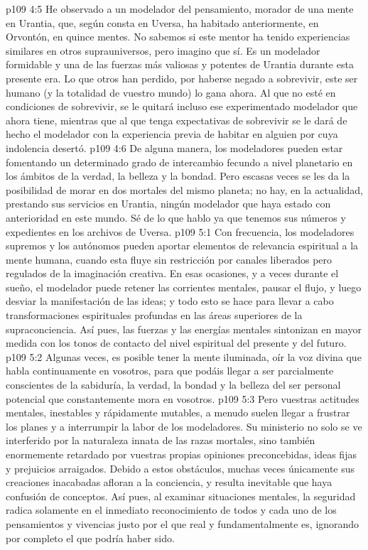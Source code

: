 \vs p109 4:5 \pc He observado a un modelador del pensamiento, morador de una mente en Urantia, que, según consta en Uversa, ha habitado anteriormente, en Orvontón, en quince mentes. No sabemos si este mentor ha tenido experiencias similares en otros suprauniversos, pero imagino que sí. Es un modelador formidable y una de las fuerzas más valiosas y potentes de Urantia durante esta presente era. Lo que otros han perdido, por haberse negado a sobrevivir, este ser humano (y la totalidad de vuestro mundo) lo gana ahora. Al que no esté en condiciones de sobrevivir, se le quitará incluso ese experimentado modelador que ahora tiene, mientras que al que tenga expectativas de sobrevivir se le dará de hecho el modelador con la experiencia previa de habitar en alguien por cuya indolencia desertó.
\vs p109 4:6 De alguna manera, los modeladores pueden estar fomentando un determinado grado de intercambio fecundo a nivel planetario en los ámbitos de la verdad, la belleza y la bondad. Pero escasas veces se les da la posibilidad de morar en dos mortales del mismo planeta; no hay, en la actualidad, prestando sus servicios en Urantia, ningún modelador que haya estado con anterioridad en este mundo. Sé de lo que hablo ya que tenemos sus números y expedientes en los archivos de Uversa.
\vs p109 5:1 Con frecuencia, los modeladores supremos y los autónomos pueden aportar elementos de relevancia espiritual a la mente humana, cuando esta fluye sin restricción por canales liberados pero regulados de la imaginación creativa. En esas ocasiones, y a veces durante el sueño, el modelador puede retener las corrientes mentales, pausar el flujo, y luego desviar la manifestación de las ideas; y todo esto se hace para llevar a cabo transformaciones espirituales profundas en las áreas superiores de la supraconciencia. Así pues, las fuerzas y las energías mentales sintonizan en mayor medida con los tonos de contacto del nivel espiritual del presente y del futuro.
\vs p109 5:2 Algunas veces, es posible tener la mente iluminada, oír la voz divina que habla continuamente en vosotros, para que podáis llegar a ser parcialmente conscientes de la sabiduría, la verdad, la bondad y la belleza del ser personal potencial que constantemente mora en vosotros.
\vs p109 5:3 Pero vuestras actitudes mentales, inestables y rápidamente mutables, a menudo suelen llegar a frustrar los planes y a interrumpir la labor de los modeladores. Su ministerio no solo se ve interferido por la naturaleza innata de las razas mortales, sino también enormemente retardado por vuestras propias opiniones preconcebidas, ideas fijas y prejuicios arraigados. Debido a estos obstáculos, muchas veces únicamente sus creaciones inacabadas afloran a la conciencia, y resulta inevitable que haya confusión de conceptos. Así pues, al examinar situaciones mentales, la seguridad radica solamente en el inmediato reconocimiento de todos y cada uno de los pensamientos y vivencias justo por el que real y fundamentalmente es, ignorando por completo el que podría haber sido.
